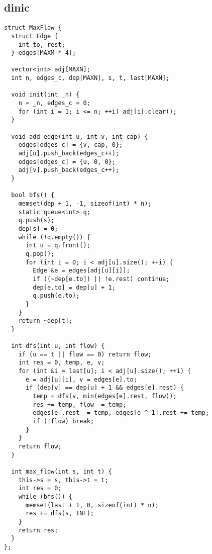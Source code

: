 \subsection{dinic}
\begin{lstlisting}
struct MaxFlow {
  struct Edge {
    int to, rest;
  } edges[MAXM * 4];

  vector<int> adj[MAXN];
  int n, edges_c, dep[MAXN], s, t, last[MAXN];

  void init(int _n) {
    n = _n, edges_c = 0;
    for (int i = 1; i <= n; ++i) adj[i].clear();
  }

  void add_edge(int u, int v, int cap) {
    edges[edges_c] = {v, cap, 0};
    adj[u].push_back(edges_c++);
    edges[edges_c] = {u, 0, 0};
    adj[v].push_back(edges_c++);
  }

  bool bfs() {
    memset(dep + 1, -1, sizeof(int) * n);
    static queue<int> q;
    q.push(s);
    dep[s] = 0;
    while (!q.empty()) {
      int u = q.front();
      q.pop();
      for (int i = 0; i < adj[u].size(); ++i) {
        Edge &e = edges[adj[u][i]];
        if ((~dep[e.to]) || !e.rest) continue;
        dep[e.to] = dep[u] + 1;
        q.push(e.to);
      }
    }
    return ~dep[t];
  }

  int dfs(int u, int flow) {
    if (u == t || flow == 0) return flow;
    int res = 0, temp, e, v;
    for (int &i = last[u]; i < adj[u].size(); ++i) {
      e = adj[u][i], v = edges[e].to;
      if (dep[v] == dep[u] + 1 && edges[e].rest) {
        temp = dfs(v, min(edges[e].rest, flow));
        res += temp, flow -= temp;
        edges[e].rest -= temp, edges[e ^ 1].rest += temp;
        if (!flow) break;
      }
    }
    return flow;
  }

  int max_flow(int s, int t) {
    this->s = s, this->t = t;
    int res = 0;
    while (bfs()) {
      memset(last + 1, 0, sizeof(int) * n);
      res += dfs(s, INF);
    }
    return res;
  }
};
\end{lstlisting}
